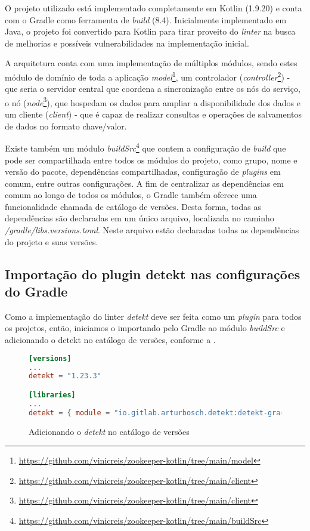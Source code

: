 O projeto utilizado está implementado completamente em Kotlin \cite{kotlin_home} (1.9.20) e conta com o Gradle \cite{gradle_home} como ferramenta de \textit{build} (8.4). Inicialmente implementado em Java, o projeto foi convertido para Kotlin para tirar proveito do \textit{linter} na busca de melhorias e possíveis vulnerabilidades na implementação inicial.

A arquitetura conta com uma implementação de múltiplos módulos, sendo estes módulo de domínio de toda a aplicação \textit{model}\footnote{\url{https://github.com/vinicreis/zookeeper-kotlin/tree/main/model}}, um controlador (\textit{controller}\footnote{\url{https://github.com/vinicreis/zookeeper-kotlin/tree/main/client}}) - que seria o servidor central que coordena a sincronização entre os nós do serviço, o nó (\textit{node}\footnote{\url{https://github.com/vinicreis/zookeeper-kotlin/tree/main/client}}), que hospedam os dados para ampliar a disponibilidade dos dados e um cliente (\textit{client}) - que é capaz de realizar consultas e operações de salvamentos de dados no formato chave/valor.

Existe também um módulo \textit{buildSrc}\footnote{\url{https://github.com/vinicreis/zookeeper-kotlin/tree/main/buildSrc}} que contem a configuração de \textit{build} que pode ser compartilhada entre todos os módulos do projeto, como grupo, nome e versão do pacote, dependências compartilhadas, configuração de \textit{plugins} em comum, entre outras configurações. A fim de centralizar as dependências em comum ao longo de todos os módulos, o Gradle também oferece uma funcionalidade chamada de catálogo de versões. Desta forma, todas as dependências são declaradas em um único arquivo, localizada no caminho \textit{/gradle/libs.versions.toml}. Neste arquivo estão declaradas todas as dependências do projeto e suas versões.

\subsection{Importação do plugin detekt nas configurações do Gradle}

Como a implementação do linter \textit{detekt} deve ser feita como um \textit{plugin} para todos os projetos, então, iniciamos o importando pelo Gradle ao módulo \textit{buildSrc} e adicionando o detekt no catálogo de versões, conforme a .

\begin{figure}[H]
    \begin{lstlisting}[language=toml,numbers = none]
[versions]
...
detekt = "1.23.3"

[libraries]
...
detekt = { module = "io.gitlab.arturbosch.detekt:detekt-gradle-plugin", version.ref = "detekt" }
    \end{lstlisting}
    \caption{Adicionando o \textit{detekt} no catálogo de versões}
    \label{fig:detekt_adding_on_version_catalog}
\end{figure}

